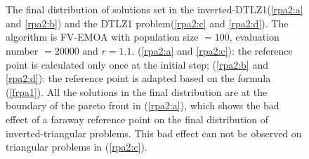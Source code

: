 \documentclass[conference]{IEEEtran}
\begin{document}
\begin{figure}[!t]
  \centering
  \quad
  \\
  \quad
  \\
  \caption{The final distribution of solutions set in the inverted-DTLZ1(\ref{rpa2:a} and \ref{rpa2:b}) 
  and the DTLZ1 problem(\ref{rpa2:c} and \ref{rpa2:d}).
  The algorithm is FV-EMOA with population size $= 100$, evaluation number $= 20000$ and $r=1.1$. 
  (\ref{rpa2:a} and \ref{rpa2:c}): the reference point is calculated only once at the initial step;
  (\ref{rpa2:b} and \ref{rpa2:d}): the reference point is adapted based on the formula (\ref{frpa1}).
  All the solutions in the final distribution are at the boundary of the pareto front in (\ref{rpa2:a}),
  which shows the bad effect of a faraway reference point
  on the final distribution of inverted-triangular problems.
  This bad effect can not be observed on triangular problems in (\ref{rpa2:c}).
  }
  \label{rpa2}
\end{figure}
\end{document}
